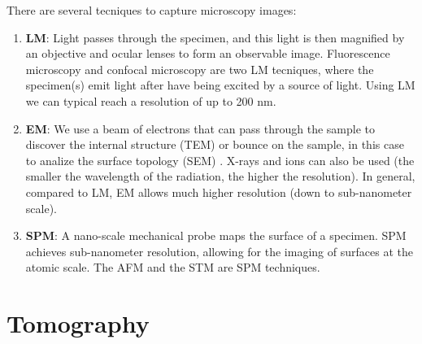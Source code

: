 There are several tecniques to capture microscopy images:

\begin{enumerate}
  \item \textbf{\gls{LM}}: Light passes through the specimen, and this light
  is then magnified by an objective and ocular lenses to form an
  observable image. Fluorescence microscopy and confocal microscopy
  are two \gls{LM} tecniques, where the specimen(s) emit light after
  have being excited by a source of light. Using \gls{LM} we can
  typical reach a resolution of up to 200 nm.

\item \textbf{\gls{EM}}: We use a beam of electrons that can pass
  through the sample to discover the internal structure (\gls{TEM}) or
  bounce on the sample, in this case to analize the surface topology
  (\gls{SEM}) \cite{timischl2012statistical}. X-rays and ions can also
  be used (the smaller the wavelength of the radiation, the higher the
  resolution). In general, compared to \gls{LM}, \gls{EM} allows much
  higher resolution (down to sub-nanometer scale).

\item \textbf{\gls{SPM}}: A nano-scale mechanical probe maps the surface of a
  specimen. \gls{SPM} achieves sub-nanometer resolution, allowing for
  the imaging of surfaces at the atomic scale. The \gls{AFM} and the
  \gls{STM} are \gls{SPM} techniques.

\end{enumerate}
  

\section{Tomography}

